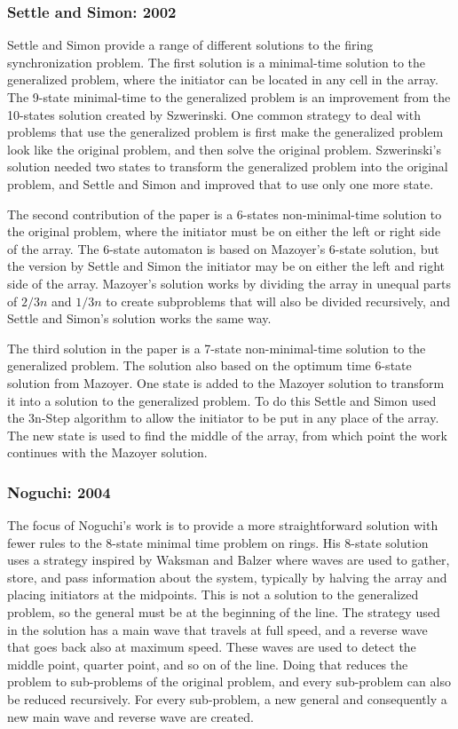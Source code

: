 \documentclass{article}
\begin{document}
\subsubsection{Settle and Simon: 2002}
Settle and Simon \cite{settle2002smaller} provide a range of different solutions to the firing synchronization problem. The first solution is a minimal-time solution to the generalized problem, where the initiator can be located in any cell in the array. The 9-state minimal-time to the generalized problem is an improvement from the 10-states solution created by Szwerinski\cite{szwerinski1982time}. One common strategy to deal with problems that use the generalized problem is first make the generalized problem look like the original problem, and then solve the original problem. Szwerinski's solution needed two states to transform the generalized problem into the original problem, and Settle and Simon and improved that to use only one more state.

The second contribution of the paper is a 6-states non-minimal-time solution to the original problem, where the initiator must be on either the left or right side of the array.
The 6-state automaton is based on Mazoyer's 6-state solution, but the version by Settle and Simon the initiator may be on either the left and right side of the array. Mazoyer's solution works by dividing the array in unequal parts of $2/3n$ and $1/3n$ to create subproblems that will also be divided recursively, and Settle and Simon's solution works the same way.

The third solution in the paper is a 7-state non-minimal-time solution to the generalized problem. The solution also based on the optimum time 6-state solution from Mazoyer. One state is added to the Mazoyer solution to transform it into a solution to the generalized problem. To do this Settle and Simon used the 3n-Step algorithm to allow the initiator to be put in any place of the array. The new state is used to find the middle of the array, from which point the work continues with the Mazoyer solution.

\subsubsection{Noguchi: 2004}
The focus of Noguchi's work is to provide a more straightforward solution with fewer rules to the 8-state minimal time problem on rings\cite{Noguchi04}. His 8-state solution uses a strategy inspired by Waksman\cite{waksman1966optimum} and Balzer\cite{Balzer1967} where waves are used to gather, store, and pass information about the system, typically by halving the array and placing initiators at the midpoints. This is not a solution to the generalized problem, so the general must be at the beginning of the line. The strategy used in the solution has a main wave that travels at full speed, and a reverse wave that goes back also at maximum speed. These waves are used to detect the middle point, quarter point, and so on of the line. Doing that reduces the problem to sub-problems of the original problem, and every sub-problem can also be reduced recursively. For every sub-problem, a new general and consequently a new main wave and reverse wave are created.
\end{document}
